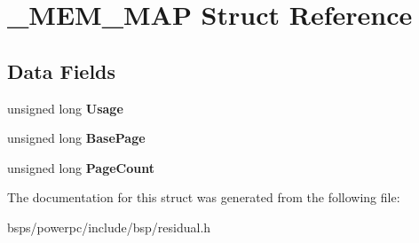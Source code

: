 \hypertarget{struct__MEM__MAP}{}\section{\+\_\+\+M\+E\+M\+\_\+\+M\+AP Struct Reference}
\label{struct__MEM__MAP}
\subsection*{Data Fields}
\begin{DoxyCompactItemize}
\item 
\mbox{\label{struct__MEM__MAP_acf10669b4cc7e080da131bd7340912cf}} 
unsigned long {\bfseries Usage}
\item 
\mbox{\label{struct__MEM__MAP_a22f87d225ca900cfb225c6df0c581bc6}} 
unsigned long {\bfseries Base\+Page}
\item 
\mbox{\label{struct__MEM__MAP_aa4ae25dba05fcf1c531845c5852753d4}} 
unsigned long {\bfseries Page\+Count}
\end{DoxyCompactItemize}


The documentation for this struct was generated from the following file\+:\begin{DoxyCompactItemize}
\item 
bsps/powerpc/include/bsp/residual.\+h\end{DoxyCompactItemize}
